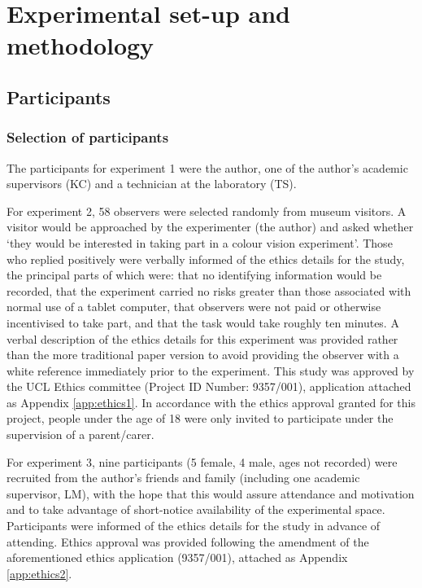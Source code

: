 \section{Experimental set-up and methodology}
\subsection{Participants}

\subsubsection{Selection of participants}

The participants for experiment 1 were the author, one of the author's academic supervisors (KC) and a technician at the laboratory (TS).

For experiment 2, 58 observers were selected randomly from museum visitors. A visitor would be approached by the experimenter (the author) and asked whether `they would be interested in taking part in a colour vision experiment'. Those who replied positively were verbally informed of the ethics details for the study, the principal parts of which were: that no identifying information would be recorded, that the experiment carried no risks greater than those associated with normal use of a tablet computer, that observers were not paid or otherwise incentivised to take part, and that the task would take roughly ten minutes. A verbal description of the ethics details for this experiment was provided rather than the more traditional paper version to avoid providing the observer with a white reference immediately prior to the experiment. This study was approved by the \gls{UCL} Ethics committee (Project ID Number: 9357/001), application attached as Appendix \ref{app:ethics1}. In accordance with the ethics approval granted for this project, people under the age of 18 were only invited to participate under the supervision of a parent/carer.

For experiment 3, nine participants (5 female, 4 male, ages not recorded) were recruited from the author's friends and family (including one academic supervisor, LM), with the hope that this would assure attendance and motivation and to take advantage of short-notice availability of the experimental space. Participants were informed of the ethics details for the study in advance of attending. Ethics approval was provided following the amendment of the aforementioned ethics application (9357/001), attached as Appendix \ref{app:ethics2}.

